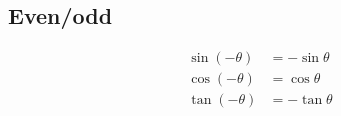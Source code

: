 \subsection*{Even/odd}

\begin{align*}
  \sin(-\theta)  &= - \sin \theta\\
  \cos(-\theta)  &= \cos \theta\\
  \tan(-\theta)  &= -\tan \theta
\end{align*}